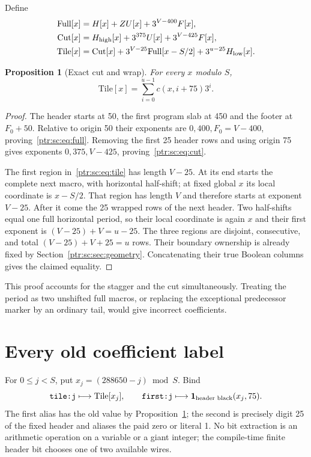 \documentclass[11pt,letterpaper]{article}
\newtheorem{proposition}[theorem]{Proposition}
\theoremstyle{definition}\newtheorem{definition}[theorem]{Definition}
\theoremstyle{remark}\newtheorem{remark}[theorem]{Remark}
\newcommand{\ind}{\mathbf 1}\newcommand{\dom}{\operatorname{dom}}
\newcommand{\op}[1]{\mathrm{#1}}
\newcommand{\codem}[1]{\mbox{\normalfont\ttfamily\detokenize{#1}}}
\begin{document}
Define
\begin{align}
 \op{Full}[x]&=H[x]+Z U[x]+3^{V-400}F[x],\label{ptr:sc:eq:full}\\
 \op{Cut}[x]&=H_{\rm high}[x]+3^{375}U[x]+3^{V-425}F[x],\label{ptr:sc:eq:cut}\\
 \op{Tile}[x]&=\op{Cut}[x]+3^{V-25}\op{Full}[x-S/2]
                   +3^{u-25}H_{\rm low}[x].\label{ptr:sc:eq:tile}
\end{align}
\begin{proposition}[Exact cut and wrap]\label{ptr:sc:prop:tile}
For every $x$ modulo $S$,
\[
 \op{Tile}[x]=\sum_{i=0}^{u-1}c(x,i+75)3^i.
\]
\end{proposition}
\begin{proof}
The header starts at 50, the first program slab at 450 and the footer at $F_0+50$. Relative to origin 50 their exponents are $0,400,F_0=V-400$, proving~\eqref{ptr:sc:eq:full}. Removing the first 25 header rows and using origin 75 gives exponents $0,375,V-425$, proving~\eqref{ptr:sc:eq:cut}.

The first region in~\eqref{ptr:sc:eq:tile} has length $V-25$. At its end starts the complete next macro, with horizontal half-shift; at fixed global $x$ its local coordinate is $x-S/2$. That region has length $V$ and therefore starts at exponent $V-25$. After it come the 25 wrapped rows of the next header. Two half-shifts equal one full horizontal period, so their local coordinate is again $x$ and their first exponent is $(V-25)+V=u-25$. The three regions are disjoint, consecutive, and total $(V-25)+V+25=u$ rows. Their boundary ownership is already fixed by Section~\ref{ptr:sc:sec:geometry}. Concatenating their true Boolean columns gives the claimed equality.
\end{proof}
This proof accounts for the stagger and the cut simultaneously. Treating the period as two unshifted full macros, or replacing the exceptional predecessor marker by an ordinary tail, would give incorrect coefficients.

\section{Every old coefficient label}\label{ptr:sc:sec:labels}
For $0\le j<S$, put $x_j=(288650-j)\bmod S$. Bind
\[
 \codem{tile:j}\longmapsto\op{Tile}[x_j],\qquad
 \codem{first:j}\longmapsto\ind_{\text{header black}}(x_j,75).
\]
The first alias has the old value by Proposition~\ref{ptr:sc:prop:tile}; the second is precisely digit 25 of the fixed header and aliases the paid zero or literal 1. No bit extraction is an arithmetic operation on a variable or a giant integer; the compile-time finite header bit chooses one of two available wires.
\end{document}
